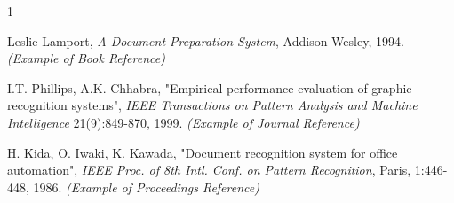 \documentclass[twoside,a4paper,11pt]{article}
\begin{document}
\begin{thebibliography}{1}

Leslie Lamport, {\em A Document Preparation System}, Addison-Wesley, 1994. 
{\em (Example of Book Reference)}

I.T. Phillips, A.K. Chhabra, "Empirical performance evaluation of graphic
recognition systems", {\em IEEE Transactions on Pattern Analysis and Machine
Intelligence} 21(9):849-870, 1999.
{\em (Example of Journal Reference)}

H. Kida, O. Iwaki, K. Kawada, "Document recognition system for office
automation", {\em IEEE Proc. of 8th Intl. Conf. on Pattern Recognition},
Paris, 1:446-448, 1986. 
{\em (Example of Proceedings Reference)}

\end{thebibliography}
\end{document}
